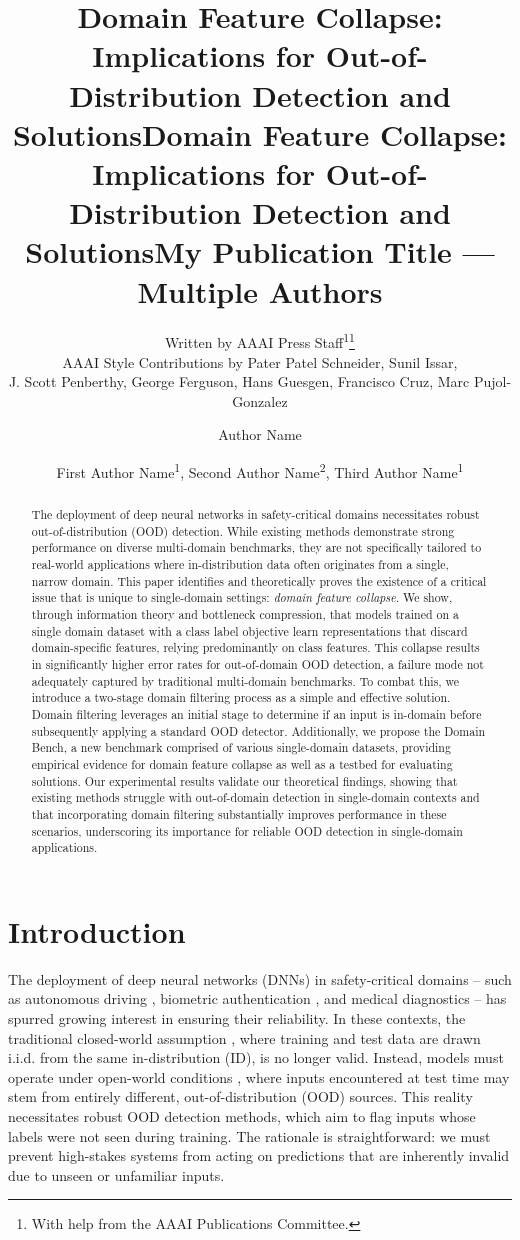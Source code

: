 \documentclass[letterpaper]{article} %
\title{Domain Feature Collapse: Implications for Out-of-Distribution Detection and Solutions}
\author{
    Written by AAAI Press Staff\textsuperscript{\rm 1}\thanks{With help from the AAAI Publications Committee.}\\
    AAAI Style Contributions by Pater Patel Schneider,
    Sunil Issar,\\
    J. Scott Penberthy,
    George Ferguson,
    Hans Guesgen,
    Francisco Cruz\equalcontrib,
    Marc Pujol-Gonzalez\equalcontrib
}
\title{Domain Feature Collapse: Implications for Out-of-Distribution Detection and Solutions}
\author {
    Author Name
}
\title{My Publication Title --- Multiple Authors}
\author {
    First Author Name\textsuperscript{\rm 1},
    Second Author Name\textsuperscript{\rm 2},
    Third Author Name\textsuperscript{\rm 1}
}
\theoremstyle{plain}
\theoremstyle{definition}
\theoremstyle{remark}
\begin{document}
\maketitle

\begin{abstract}

The deployment of deep neural networks in safety-critical domains necessitates robust out-of-distribution (OOD) detection. While existing methods demonstrate strong performance on diverse multi-domain benchmarks, they are not specifically tailored to real-world applications where in-distribution data often originates from a single, narrow domain. This paper identifies and theoretically proves the existence of a critical issue that is unique to single-domain settings: \emph{domain feature collapse}. We show, through information theory and bottleneck compression, that models trained on a single domain dataset with a class label objective learn representations that discard domain-specific features, relying predominantly on class features. This collapse results in significantly higher error rates for out-of-domain OOD detection, a failure mode not adequately captured by traditional multi-domain benchmarks. To combat this, we introduce a two-stage domain filtering process as a simple and effective solution. Domain filtering leverages an initial stage to determine if an input is in-domain before subsequently applying a standard OOD detector. Additionally, we propose the Domain Bench, a new benchmark comprised of various single-domain datasets, providing empirical evidence for domain feature collapse as well as a testbed for evaluating solutions. Our experimental results validate our theoretical findings, showing that existing methods struggle with out-of-domain detection in single-domain contexts and that incorporating domain filtering substantially improves performance in these scenarios, underscoring its importance for reliable OOD detection in single-domain applications.

\end{abstract}

\section{Introduction}
\label{sec:intro}

The deployment of deep neural networks (DNNs) in safety-critical domains -- such as autonomous driving \citep{ramanagopal2018failing}, biometric authentication \citep{wang2021deep}, and medical diagnostics \citep{bakator2018deep} -- has spurred growing interest in ensuring their reliability. In these contexts, the traditional closed-world assumption \citep{krizhevsky2012imagenet}, where training and test data are drawn i.i.d. from the same in-distribution (ID), is no longer valid. Instead, models must operate under open-world conditions \citep{drummond2006open}, where inputs encountered at test time may stem from entirely different, out-of-distribution (OOD) sources. This reality necessitates robust OOD detection methods, which aim to flag inputs whose labels were not seen during training. The rationale is straightforward: we must prevent high-stakes systems from acting on predictions that are inherently invalid due to unseen or unfamiliar inputs.
\end{document}
